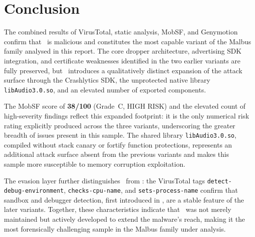 \section{Conclusion}

The combined results of VirusTotal, static analysis, MobSF, and Genymotion confirm that \threer\ is malicious and constitutes the most capable variant of the Malbus family analysed in this report.
The core dropper architecture, advertising SDK integration, and certificate weaknesses identified in the two earlier variants are fully preserved, but \threer\ introduces a qualitatively distinct expansion of the attack surface through the Crashlytics SDK, the unprotected native library \texttt{libAudio3.0.so}, and an elevated number of exported components.

The MobSF score of \textbf{38/100} (Grade~C, HIGH RISK) and the elevated count of high-severity findings reflect this expanded footprint: it is the only numerical risk rating explicitly produced across the three variants, underscoring the greater breadth of issues present in this sample.
The shared library \texttt{libAudio3.0.so}, compiled without stack canary or fortify function protections, represents an additional attack surface absent from the previous variants and makes this sample more susceptible to memory corruption exploitation.

The evasion layer further distinguishes \threer\ from \oner: the VirusTotal tags \texttt{detect-debug-environment}, \texttt{checks-cpu-name}, and \texttt{sets-process-name} confirm that sandbox and debugger detection, first introduced in \twor, are a stable feature of the later variants.
Together, these characteristics indicate that \threer\ was not merely maintained but actively developed to extend the malware's reach, making it the most forensically challenging sample in the Malbus family under analysis.
